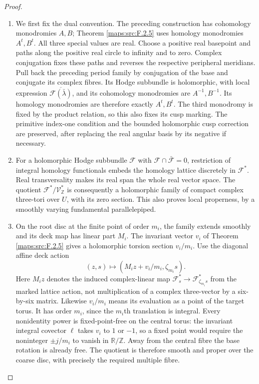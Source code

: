 \documentclass[11pt,a4paper]{article}
\theoremstyle{definition}
\begin{document}
\begin{proof}
\begin{enumerate}[label=\arabic*.]
\item We first fix the dual convention.  The preceding construction
has cohomology monodromies $A,B$; Theorem \ref{maps:src:F.2.5} uses homology
monodromies $A^t,B^t$.  All three special values are real.
Choose a positive real basepoint and paths along the positive
real circle to infinity and to zero.  Complex conjugation fixes
these paths and reverses the respective peripheral meridians.
Pull back the preceding period family by conjugation of the
base and conjugate its complex fibres.  Its Hodge subbundle is
holomorphic, with local expression
$\overline{\mathcal F(\bar\lambda)}$, and its cohomology
monodromies are $A^{-1},B^{-1}$.  Its homology monodromies are
therefore exactly $A^t,B^t$.  The third monodromy is fixed by
the product relation, so this also fixes its cusp marking.
The primitive index-one condition and the bounded holomorphic
cusp correction are preserved, after replacing the real
angular basis by its negative if necessary.

\item For a holomorphic Hodge subbundle $\mathcal F$ with
$\mathcal F\cap\bar{\mathcal F}=0$, restriction of integral
homology functionals embeds the homology lattice discretely in
$\mathcal F^*$.  Real transversality makes its real span the
whole real vector space.  The quotient
$\mathcal F^*/\mathcal V_{\mathbb Z}^*$ is consequently a
holomorphic family of compact complex three-tori over $U$,
with its zero section.  This also proves local properness,
by a smoothly varying fundamental parallelepiped.

\item On the root disc at the finite point of order $m_i$, the family
extends smoothly and its deck map has linear part $M_i$.
The invariant vector $v_i$ of Theorem \ref{maps:src:F.2.5} gives a holomorphic
torsion section $v_i/m_i$.  Use the diagonal affine deck action
\[
 (z,s)\longmapsto(M_i z+v_i/m_i,\zeta_{m_i}s).
 \tag{F.24}\label{maps:eq:F.24}
\]
Here $M_i z$ denotes the induced complex-linear map
$\mathcal F_s^*\to\mathcal F_{\zeta_{m_i}s}^*$ from the marked
lattice action, not multiplication of a complex three-vector
by a six-by-six matrix.  Likewise $v_i/m_i$ means its evaluation
as a point of the target torus.
It has order $m_i$, since the $m_i$th translation is integral.
Every nonidentity power is fixed-point-free on the central
torus: the invariant integral covector $\ell$ takes $v_i$ to
$1$ or $-1$, so a fixed point would require the noninteger
$\pm j/m_i$ to vanish in $\mathbb R/\mathbb Z$.
Away from the central fibre the base rotation is already free.
The quotient is therefore smooth and proper over the coarse
disc, with precisely the required multiple fibre.


\end{enumerate}
\end{proof}
\end{document}
